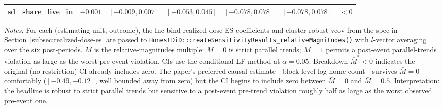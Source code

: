 \begin{table}[H]
{\begin{tabular}{llcccccc}
    sd     & share\_live\_in            & $-0.001$ & $[-0.009, 0.007]$ & $[-0.053, 0.045]$ & $[-0.078, 0.078]$ & $[-0.078, 0.078]$ & $<0$ \\
    \bottomrule
  \end{tabular}
  }
  \vspace{0.3em}
  \begin{minipage}{0.95\textwidth}
    \footnotesize \textit{Notes:} For each (estimating unit, outcome), the Inc-bind realized-dose ES coefficients and cluster-robust vcov from the spec in Section~\ref{subsec:realized-dose-es} are passed to \texttt{HonestDiD::createSensitivityResults\_relativeMagnitudes()} with $l$-vector averaging over the six post-periods. $\bar{M}$ is the relative-magnitudes multiple: $\bar{M}=0$ is strict parallel trends; $\bar{M}=1$ permits a post-event parallel-trends violation as large as the worst pre-event violation. CIs use the conditional-LF method at $\alpha=0.05$. Breakdown $\bar{M}^{*}<0$ indicates the original (no-restriction) CI already includes zero. The paper's preferred causal estimate---block-level log home count---survives $\bar{M}=0$ comfortably ($[-0.49, -0.12]$, well bounded away from zero) but the CI begins to include zero between $\bar{M}=0$ and $\bar{M}=0.5$. Interpretation: the headline is robust to strict parallel trends but sensitive to a post-event pre-trend violation roughly half as large as the worst observed pre-event one.
  \end{minipage}
\end{table}
